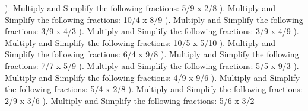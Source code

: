 \documentclass{article}%
\begin{document}
\newline%
). Multiply and Simplify the following fractions: 5/9 x 2/8%
\newline%
\newline%
). Multiply and Simplify the following fractions: 10/4 x 8/9%
\newline%
\newline%
). Multiply and Simplify the following fractions: 3/9 x 4/3%
\newline%
\newline%
). Multiply and Simplify the following fractions: 3/9 x 4/9%
\newline%
\newline%
). Multiply and Simplify the following fractions: 10/5 x 5/10%
\newline%
\newline%
). Multiply and Simplify the following fractions: 6/4 x 9/8%
\newline%
\newline%
). Multiply and Simplify the following fractions: 7/7 x 5/9%
\newline%
\newline%
). Multiply and Simplify the following fractions: 5/5 x 9/3%
\newline%
\newline%
). Multiply and Simplify the following fractions: 4/9 x 9/6%
\newline%
\newline%
). Multiply and Simplify the following fractions: 5/4 x 2/8%
\newline%
\newline%
). Multiply and Simplify the following fractions: 2/9 x 3/6%
\newline%
\newline%
). Multiply and Simplify the following fractions: 5/6 x 3/2%
\newline%
\newline%
\end{document}
